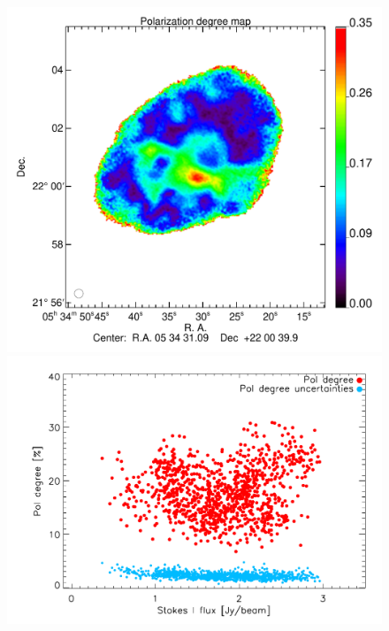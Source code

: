 \documentclass[twocolumn,traditabstract]{aa}
\begin{document}
 \begin{figure}
\centering
\includegraphics[clip, angle=0, scale = 0.35]{figures/Crab_pol_deg2_2mm.pdf}
\includegraphics[clip, angle=0, scale = 0.5]{figures/pol_deg_vs_I_2mm.pdf}

\end{figure}
\end{document}

